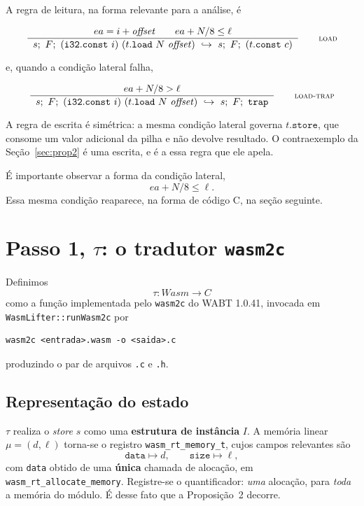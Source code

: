 \documentclass[11pt,a4paper]{article}
\theoremstyle{definition}
\newcommand{\code}[1]{\texttt{#1}}
\newcommand{\rulelabel}[1]{\textnormal{\textsc{\footnotesize #1}}}
\begin{document}
A regra de leitura,
na forma relevante para a análise, é

\begin{equation*}
  \frac{\;\; ea = i + \mathit{offset} \qquad ea + N/8 \le \ell \;\;}
       {\;\; s;\ F;\ (\mathtt{i32.const}\ i)\ (t.\mathtt{load}\ N\ \mathit{offset})
          \ \hookrightarrow\ s;\ F;\ (t.\mathtt{const}\ c) \;\;}
  \tag*{\rulelabel{load}}
\end{equation*}

\noindent
e, quando a condição lateral falha,

\begin{equation*}
  \frac{\;\; ea + N/8 > \ell \;\;}
       {\;\; s;\ F;\ (\mathtt{i32.const}\ i)\ (t.\mathtt{load}\ N\ \mathit{offset})
          \ \hookrightarrow\ s;\ F;\ \mathtt{trap} \;\;}
  \tag*{\rulelabel{load-trap}}
\end{equation*}

A regra de escrita é simétrica: a mesma condição lateral governa
$t.\mathtt{store}$, que consome um valor adicional da pilha e não devolve
resultado. O contraexemplo da Seção~\ref{sec:prop2} é uma escrita, e é a essa
regra que ele apela.

É importante observar a forma da
condição lateral,
\[
  ea + N/8 \le \ell.
\]
Essa mesma condição reaparece, na forma de código C, na seção seguinte.

\section{Passo 1, $\tau$: o tradutor \code{wasm2c}}

Definimos
\[
  \tau : \mathit{Wasm} \longrightarrow \mathit{C}
\]
como a função implementada pelo \code{wasm2c} do WABT 1.0.41, invocada em
\code{WasmLifter::runWasm2c} por

\begin{lstlisting}
wasm2c <entrada>.wasm -o <saida>.c
\end{lstlisting}

\noindent
produzindo o par de arquivos \code{.c} e \code{.h}.

\subsection{Representação do estado}

$\tau$ realiza o \emph{store} $s$ como uma \textbf{estrutura de instância} $I$. A
memória linear $\mu = (d,\ell)$ torna-se o registro \code{wasm\_rt\_memory\_t},
cujos campos relevantes são
\[
  \code{data} \mapsto d, \qquad \code{size} \mapsto \ell,
\]
com \code{data} obtido de uma \textbf{única} chamada de alocação, em
\code{wasm\_rt\_allocate\_memory}. Registre-se o quantificador: \emph{uma}
alocação, para \emph{toda} a memória do módulo. É desse fato que a Proposição~2
decorre.
\end{document}
